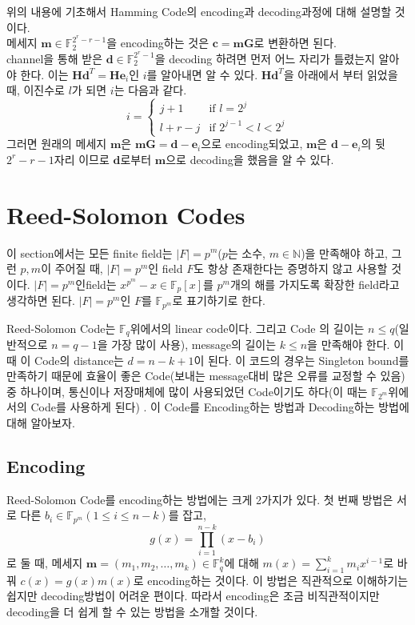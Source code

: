 \documentclass[11pt]{article}
\begin{document}
위의 내용에 기초해서 Hamming Code의 encoding과 decoding과정에 대해 설명할 것이다.\\
메세지 $\mathbf{m}\in \mathbb{F}_{2}^{2^{r}-r-1}$을 encoding하는 것은 $\mathbf{c}=\mathbf{m}\mathbf{G}$로 변환하면 된다.\\
channel을 통해 받은 $\mathbf{d}\in\mathbb{F}_{2}^{2^{r}-1}$을 decoding 하려면 먼저 어느 자리가 틀렸는지 알아야 한다. 이는 
$\mathbf{H}\mathbf{d}^{T}=\mathbf{H}\mathbf{e}_{i}$인 $i$를 알아내면 알 수 있다. $\mathbf{H}\mathbf{d}^{T}$을 아래에서 부터 읽었을 때, 이진수로 $l$가 되면 $i$는 다음과 같다. 
\begin{displaymath}
i= \left\{ \begin{array}{ll}
j +1& \textrm{if $l=2^{j}$}\\
l+r-j & \textrm{if $2^{j-1}<l<2^{j}$}
\end{array} \right.
\end{displaymath}
그러면 원래의 메세지 $\mathbf{m}$은 $\mathbf{m}\mathbf{G}=\mathbf{d}-\mathbf{e}_{i}$으로 encoding되었고, $\mathbf{m}$은 $\mathbf{d}-\mathbf{e}_{i}$의 뒷 $2^{r}-r-1$자리 이므로 $\mathbf{d}$로부터 $\mathbf{m}$으로 decoding을 했음을 알 수 있다.



\section{Reed-Solomon Codes}
이 section에서는 모든 finite field는 $\vert F\vert=p^{m}$($p$는 소수, $m\in\mathbb{N}$)을 만족해야 하고, 그런 $p,m$이 주어질 때, $\vert F\vert=p^{m}$인 field $F$도 항상 존재한다는 증명하지 않고 사용할 것이다. $\vert F\vert=p^{m}$인field는 $x^{p^{m}}-x\in\mathbb{F}_{p}[x]$를 $p^{m}$개의 해를 가지도록 확장한 field라고 생각하면 된다. $\vert F\vert=p^{m}$인 $F$를 $\mathbb{F}_{p^{m}}$로 표기하기로 한다.

Reed-Solomon Code는 $\mathbb{F}_{q}$위에서의 linear code이다.  그리고 Code 의 길이는 $n\leq q$(일반적으로 $n=q-1$을 가장 많이 사용), message의 길이는 $k\leq n$을 만족해야 한다. 이 때 이 Code의 distance는 $d=n-k+1$이 된다.  이 코드의 경우는 Singleton bound를 만족하기 때문에 효율이 좋은 Code(보내는 message대비 많은 오류를 교정할 수 있음)중 하나이며, 통신이나 저장매체에 많이 사용되었던 Code이기도 하다(이 때는 $\mathbb{F}_{2^{m}}$위에서의 Code를 사용하게 된다) . 이 Code를 Encoding하는 방법과 Decoding하는 방법에 대해 알아보자.
\subsection{Encoding}
Reed-Solomon Code를 encoding하는 방법에는 크게 2가지가 있다. 첫 번째 방법은 서로 다른 $b_{i}\in\mathbb{F}_{p^{m}}(1\leq i\leq n-k)$를 잡고,
\begin{displaymath}
g(x) = \prod_{i=1}^{n-k} (x-b_{i})
\end{displaymath}
로 둘 때, 메세지 $\mathbf{m}=(m_{1},m_{2},\dots,m_{k})\in\mathbb{F}_{q}^{k}$에 대해 $m(x) = \sum_{i = 1}^{k} m_{i}x^{i-1}$로 바꿔 $c(x) = g(x)m(x)$로 encoding하는 것이다. 이 방법은 직관적으로 이해하기는 쉽지만 decoding방법이 어려운 편이다. 따라서 encoding은 조금 비직관적이지만 decoding을 더 쉽게 할 수 있는 방법을 소개할 것이다.
\end{document}
